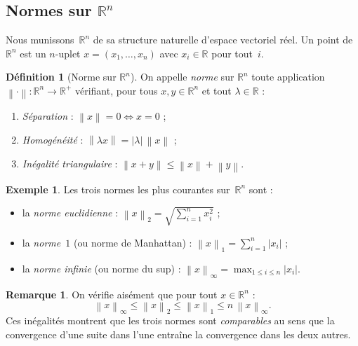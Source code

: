 \documentclass[12pt,a4paper,openany]{book}
\theoremstyle{definition}
\newtheorem{definition}{Définition}[chapter]
\newtheorem{remarque}{Remarque}[chapter]
\newtheorem{exemple}{Exemple}[chapter]
\newcommand{\R}{\mathbb{R}}
\newcommand{\abs}[1]{\left\lvert #1 \right\rvert}
\newcommand{\norm}[1]{\left\lVert #1 \right\rVert}
\begin{document}
\subsection{Normes sur \texorpdfstring{$\R^n$}{Rn}}
\label{subsec:normes-Rn}

Nous munissons~$\R^n$ de sa structure naturelle d'espace vectoriel réel. Un point de~$\R^n$ est un $n$-uplet $x = (x_1, \ldots, x_n)$ avec $x_i \in \R$ pour tout~$i$.

\begin{definition}[Norme sur $\R^n$]\label{def:norme-Rn}
  On appelle \emph{norme} sur $\R^n$ toute application $\norm{\cdot} \colon \R^n \to \R^+$ vérifiant, pour tous $x, y \in \R^n$ et tout $\lambda \in \R$ :
  \begin{enumerate}[label=(\roman*)]
    \item \emph{Séparation} : $\norm{x} = 0 \iff x = 0$ ;
    \item \emph{Homogénéité} : $\norm{\lambda x} = \abs{\lambda} \, \norm{x}$ ;
    \item \emph{Inégalité triangulaire} : $\norm{x + y} \leqslant \norm{x} + \norm{y}$.
  \end{enumerate}
\end{definition}

\begin{exemple}
  \label{ex:normes-classiques}
  Les trois normes les plus courantes sur~$\R^n$ sont :
  \begin{itemize}
    \item la \emph{norme euclidienne} :
    $\displaystyle \norm{x}_2 = \sqrt{\sum_{i=1}^n x_i^2}$ ;
    \item la \emph{norme~$1$} (ou norme de Manhattan) :
    $\displaystyle \norm{x}_1 = \sum_{i=1}^n \abs{x_i}$ ;
    \item la \emph{norme infinie} (ou norme du sup) :
    $\displaystyle \norm{x}_\infty = \max_{1 \leqslant i \leqslant n} \abs{x_i}$.
  \end{itemize}
\end{exemple}

\begin{remarque}
  \label{rem:inegalites-normes}
  On vérifie aisément que pour tout $x \in \R^n$ :
  \[
    \norm{x}_\infty \leqslant \norm{x}_2 \leqslant \norm{x}_1 \leqslant n \, \norm{x}_\infty.
  \]
  Ces inégalités montrent que les trois normes sont \emph{comparables} au sens que la convergence d'une suite dans l'une entraîne la convergence dans les deux autres.
\end{remarque}
\end{document}
